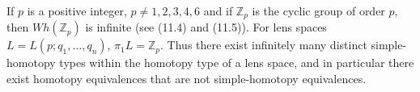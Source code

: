 If $p$ is a positive integer, $p \neq 1, 2, 3, 4, 6$ and if $\mathbb{Z}_p$ is the cyclic group of order $p$, then $Wh(\mathbb{Z}_p)$ is infinite (see (11.4) and (11.5)). For lens spaces $L = L(p; q_1, \ldots, q_n)$, $\pi_1 L = \mathbb{Z}_p$. Thus there exist infinitely many distinct simple-homotopy types within the homotopy type of a lens space, and in particular there exist homotopy equivalences that are not simple-homotopy equivalences.
